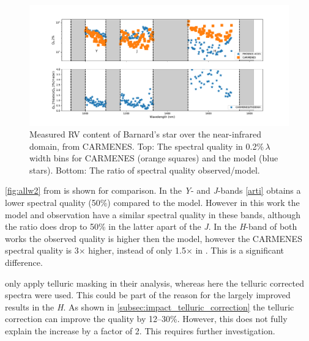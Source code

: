\begin{figure}
    \centering
    \includegraphics[width=0.8\linewidth]{figures/information-content/Carmenes/quality_comparision_to_model}
    \caption[Barnard's star spectral quality compared to CARMENES]{Measured RV content of Barnard's star over the near-infrared domain, from CARMENES.
    Top: The spectral quality in 0.2\%\,\(\lambda\) width bins for CARMENES (orange squares) and the model (blue stars).
    Bottom: The ratio of spectral quality observed/model.}
    \label{fig:qualitycomparisiontomodel}
\end{figure}

\cref{fig:allw2} from \citep{artigau_optical_2018} is shown for comparison.
In the \emph{Y}- and \emph{J}-bands \cref{arti} obtains a lower spectral quality (50\%) compared to the model.
However in this work the model and observation have a similar spectral quality in these bands, although the ratio does drop to 50\% in the latter apart of the \emph{J}.
In the \emph{H}-band of both works the observed quality is higher then the model, however the CARMENES spectral quality is 3\(\times\) higher, instead of only 1.5\(\times\) in \citep{artigau_optical_2018}.
This is a significant difference.

\citep{artigau_optical_2018} only apply telluric masking in their analysis, whereas here the telluric corrected spectra were used.
This could be part of the reason for the largely improved results in the \emph{H}.
As shown in \cref{subsec:impact_telluric_correction} the telluric correction can improve the quality by 12--30\%.
However, this does not fully explain the increase by a factor of 2.
This requires further investigation.


